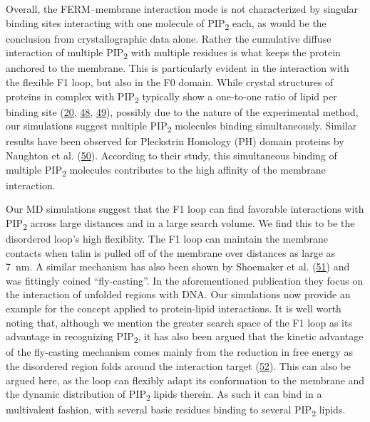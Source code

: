 \documentclass[
  twocolumn]{biophys-new-mod}
\begin{document}
Overall, the FERM--membrane interaction mode is not characterized by
singular binding sites interacting with one molecule of
PIP\textsubscript{2} each, as would be the conclusion from
crystallographic data alone. Rather the cumulative diffuse interaction
of multiple PIP\textsubscript{2} with multiple residues is what keeps
the protein anchored to the membrane. This is particularly evident in
the interaction with the flexible F1 loop, but also in the F0 domain.
While crystal structures of proteins in complex with
PIP\textsubscript{2} typically show a one-to-one ratio of lipid per
binding site
(\protect\hyperlink{ref-chinthalapudiInteractionTalinCell2018a}{20},
\protect\hyperlink{ref-chinthalapudiLipidBindingPromotes2018}{48},
\protect\hyperlink{ref-jianMolecularBasisCooperative2015}{49}), possibly
due to the nature of the experimental method, our simulations suggest
multiple PIP\textsubscript{2} molecules binding simultaneously. Similar
results have been observed for Pleckstrin Homology (PH) domain proteins
by Naughton et al.
(\protect\hyperlink{ref-naughtonModesInteractionPleckstrin2018}{50}).
According to their study, this simultaneous binding of multiple
PIP\textsubscript{2} molecules contributes to the high affinity of the
membrane interaction.

Our MD simulations suggest that the F1 loop can find favorable
interactions with PIP\textsubscript{2} across large distances and in a
large search volume. We find this to be the disordered loop's high
flexiblity. The F1 loop can maintain the membrane contacts when talin is
pulled off of the membrane over distances as large as 7~nm. A similar
mechanism has also been shown by Shoemaker et al.
(\protect\hyperlink{ref-shoemakerSpeedingMolecularRecognition2000}{51})
and was fittingly coined ``fly-casting''. In the aforementioned
publication they focus on the interaction of unfolded regions with DNA.
Our simulations now provide an example for the concept applied to
protein-lipid interactions. It is well worth noting that, although we
mention the greater search space of the F1 loop as its advantage in
recognizing PIP\textsubscript{2}, it has also been argued that the
kinetic advantage of the fly-casting mechanism comes mainly from the
reduction in free energy as the disordered region folds around the
interaction target
(\protect\hyperlink{ref-huangKineticAdvantageIntrinsically2009}{52}).
This can also be argued here, as the loop can flexibly adapt its
conformation to the membrane and the dynamic distribution of
PIP\textsubscript{2} lipids therein. As such it can bind in a
multivalent fashion, with several basic residues binding to several
PIP\textsubscript{2} lipids.
\end{document}
